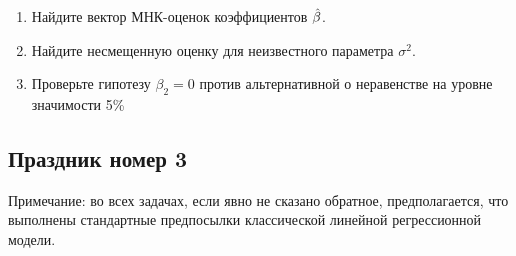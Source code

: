 \documentclass[12pt, a4paper]{article}\usepackage[]{graphicx}\usepackage[]{color}
\begin{document}
\begin{enumerate}
\begin{enumerate}
\item Найдите вектор МНК-оценок коэффициентов $\hat{\beta}$.
\item Найдите несмещенную оценку для неизвестного параметра $\sigma^2$.
\item Проверьте гипотезу $\beta_2=0$ против альтернативной о неравенстве на уровне значимости 5\%
\end{enumerate}


\end{enumerate}


\subsection{Праздник номер 3}
Примечание: во всех задачах, если явно не сказано обратное, предполагается, что выполнены стандартные предпосылки классической линейной регрессионной модели.
\end{document}
